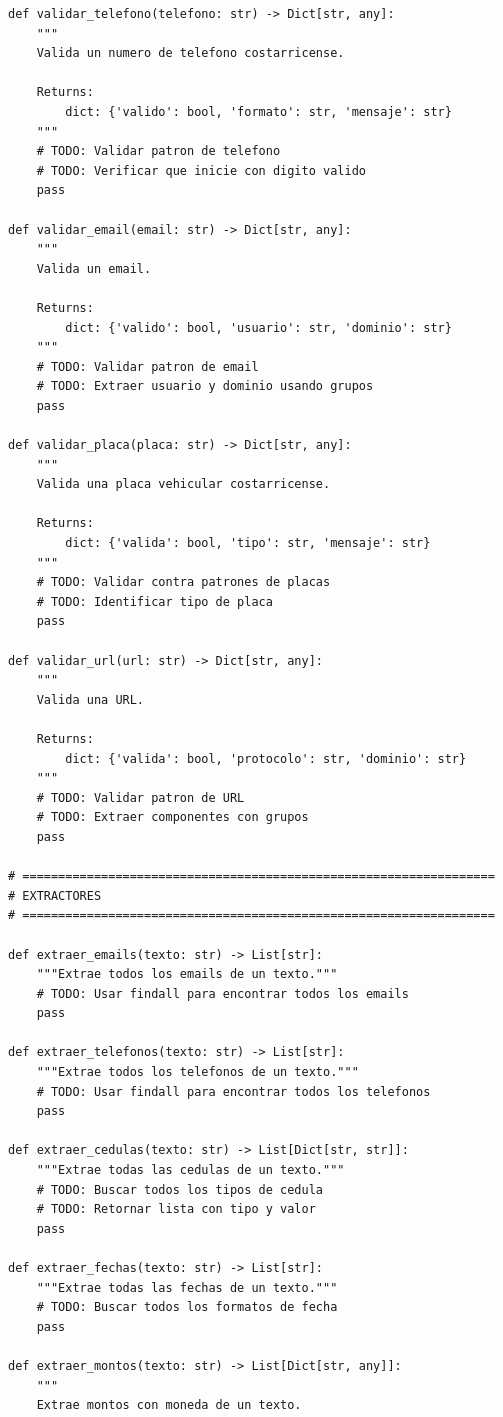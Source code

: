 \documentclass[11pt,letterpaper]{article}
\begin{document}
\begin{lstlisting}[caption={Plantilla del validador y extractor}]
def validar_telefono(telefono: str) -> Dict[str, any]:
    """
    Valida un numero de telefono costarricense.
    
    Returns:
        dict: {'valido': bool, 'formato': str, 'mensaje': str}
    """
    # TODO: Validar patron de telefono
    # TODO: Verificar que inicie con digito valido
    pass

def validar_email(email: str) -> Dict[str, any]:
    """
    Valida un email.
    
    Returns:
        dict: {'valido': bool, 'usuario': str, 'dominio': str}
    """
    # TODO: Validar patron de email
    # TODO: Extraer usuario y dominio usando grupos
    pass

def validar_placa(placa: str) -> Dict[str, any]:
    """
    Valida una placa vehicular costarricense.
    
    Returns:
        dict: {'valida': bool, 'tipo': str, 'mensaje': str}
    """
    # TODO: Validar contra patrones de placas
    # TODO: Identificar tipo de placa
    pass

def validar_url(url: str) -> Dict[str, any]:
    """
    Valida una URL.
    
    Returns:
        dict: {'valida': bool, 'protocolo': str, 'dominio': str}
    """
    # TODO: Validar patron de URL
    # TODO: Extraer componentes con grupos
    pass

# ==================================================================
# EXTRACTORES
# ==================================================================

def extraer_emails(texto: str) -> List[str]:
    """Extrae todos los emails de un texto."""
    # TODO: Usar findall para encontrar todos los emails
    pass

def extraer_telefonos(texto: str) -> List[str]:
    """Extrae todos los telefonos de un texto."""
    # TODO: Usar findall para encontrar todos los telefonos
    pass

def extraer_cedulas(texto: str) -> List[Dict[str, str]]:
    """Extrae todas las cedulas de un texto."""
    # TODO: Buscar todos los tipos de cedula
    # TODO: Retornar lista con tipo y valor
    pass

def extraer_fechas(texto: str) -> List[str]:
    """Extrae todas las fechas de un texto."""
    # TODO: Buscar todos los formatos de fecha
    pass

def extraer_montos(texto: str) -> List[Dict[str, any]]:
    """
    Extrae montos con moneda de un texto.
    

\end{lstlisting}
\end{document}
